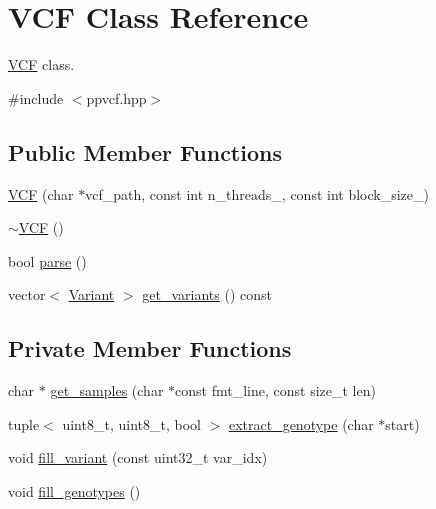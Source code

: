 \hypertarget{classVCF}{}\section{V\+CF Class Reference}
\label{classVCF}


\mbox{\hyperlink{classVCF}{V\+CF}} class.  




{\ttfamily \#include $<$ppvcf.\+hpp$>$}

\subsection*{Public Member Functions}
\begin{DoxyCompactItemize}
\item 
\mbox{\hyperlink{classVCF_a7f3175ad616eff67664a23784442401e}{V\+CF}} (char $\ast$vcf\+\_\+path, const int n\+\_\+threads\+\_\+, const int block\+\_\+size\+\_\+)
\item 
\mbox{\hyperlink{classVCF_a958876d27c3bc0aad5d5ac2533c733a9}{$\sim$\+V\+CF}} ()
\item 
bool \mbox{\hyperlink{classVCF_a543c2a6f7f1ab2a2c4aa47cdb6792b66}{parse}} ()
\item 
vector$<$ \mbox{\hyperlink{classVariant}{Variant}} $>$ \mbox{\hyperlink{classVCF_aea647d1c90eed8db57aae07325f3510c}{get\+\_\+variants}} () const
\end{DoxyCompactItemize}
\subsection*{Private Member Functions}
\begin{DoxyCompactItemize}
\item 
char $\ast$ \mbox{\hyperlink{classVCF_a18a5db0368a429daed852bc04e5142c9}{get\+\_\+samples}} (char $\ast$const fmt\+\_\+line, const size\+\_\+t len)
\item 
tuple$<$ uint8\+\_\+t, uint8\+\_\+t, bool $>$ \mbox{\hyperlink{classVCF_a7f79a696d60acd7bccd30673e6fcc755}{extract\+\_\+genotype}} (char $\ast$start)
\item 
void \mbox{\hyperlink{classVCF_ae26856f38fd616a79c41e40ab61a308f}{fill\+\_\+variant}} (const uint32\+\_\+t var\+\_\+idx)
\item 
void \mbox{\hyperlink{classVCF_a8252c15bb2e4e7a517459ee4bc80ea92}{fill\+\_\+genotypes}} ()
\end{DoxyCompactItemize}
